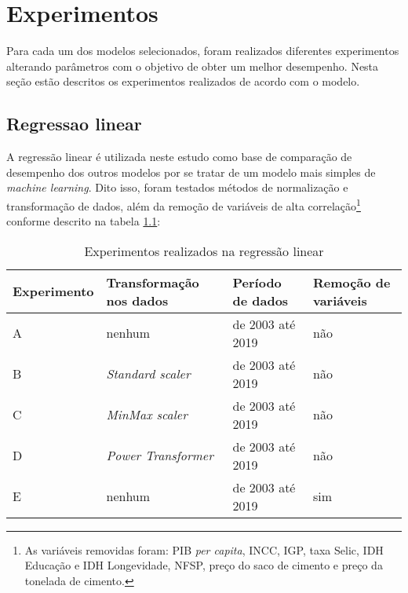 
\chapter{Experimentos}
\label{chap:experimentos}

Para cada um dos modelos selecionados, foram realizados diferentes experimentos
alterando parâmetros com o objetivo de obter um melhor 
desempenho. Nesta seção estão descritos os experimentos realizados de acordo 
com o modelo.


\section{Regressao linear}

A regressão linear é utilizada 
neste estudo como base de comparação de desempenho dos outros modelos por se tratar de um modelo mais simples de \textit{machine learning}. 
Dito isso, foram testados métodos de normalização  e transformação de 
dados, além da 
remoção de variáveis de alta correlação\footnote{As variáveis removidas foram: PIB \textit{per capita}, INCC, IGP, taxa Selic, IDH Educação e IDH Longevidade, 
NFSP, preço do saco de cimento e preço da tonelada de cimento.}  conforme 
descrito na tabela \ref{tab:exp-reg-lin}:

\begin{table}
    \centering
    \caption{Experimentos realizados na regressão linear}
    \begin{tabular}{llll}
        \toprule
        Experimento & Transformação nos dados     & Período de dados & Remoção de variáveis  \\
        \midrule
        A           & nenhum & de 2003 até 2019            & não~                                     \\
        B           & \textit{Standard scaler}~            & de 2003 até 2019            & não~ ~                                   \\
        C           & \textit{MinMax scaler}~ ~            & de 2003 até 2019            & não~ ~ ~                                 \\
        D           & \textit{Power Transformer}           & de 2003 até 2019            & não                                      \\
        E           & nenhum & de 2003 até 2019            & sim                                     \\
        \bottomrule
    \end{tabular}
    \label{tab:exp-reg-lin}
\end{table}

